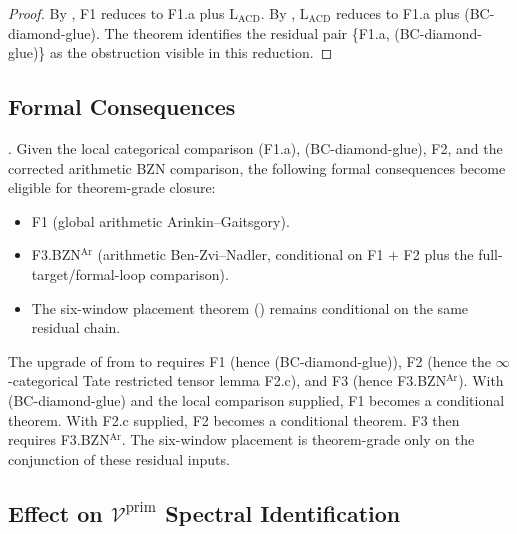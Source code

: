 \begin{proof}
By , F1 reduces to F1.a plus
\(\mathrm{L}_{\mathrm{ACD}}\). By
,
\(\mathrm{L}_{\mathrm{ACD}}\) reduces to F1.a plus (BC-diamond-glue).
The theorem identifies the residual pair \{F1.a, (BC-diamond-glue)\}
as the obstruction visible in this reduction.
\end{proof}

\subsection{Formal Consequences}

\begin{corollary}
\label{v4-arith:acd:cor:consequent-form}
\ClaimStatusNeedsVerification. Given the local categorical comparison
(F1.a), (BC-diamond-glue), F2, and the corrected arithmetic BZN
comparison, the following formal consequences become eligible for
theorem-grade closure:
\begin{itemize}
\item F1 (global arithmetic Arinkin--Gaitsgory).
\item F3.BZN\(^{\mathrm{Ar}}\) (arithmetic Ben-Zvi--Nadler, conditional
on F1 \(+\) F2 plus the full-target/formal-loop comparison).
\item The six-window placement theorem
() remains conditional on
the same residual chain.
\end{itemize}
\end{corollary}

\begin{remark}
\label{v4-arith:acd:rem:six-window-upgrade}
The upgrade of  from
\ClaimStatusConjectured to \ClaimStatusProvedHere requires F1 (hence
(BC-diamond-glue)), F2 (hence the \(\infty\)-categorical Tate
restricted tensor lemma F2.c), and F3 (hence F3.BZN\(^{\mathrm{Ar}}\)).
With (BC-diamond-glue) and the local comparison supplied, F1 becomes a
conditional theorem.  With F2.c supplied, F2 becomes a conditional
theorem.  F3 then requires F3.BZN\(^{\mathrm{Ar}}\). The six-window
placement is theorem-grade only on the conjunction of these residual
inputs.
\end{remark}

\subsection{Effect on \(\mathcal{V}^{\mathrm{prim}}\) Spectral Identification}

